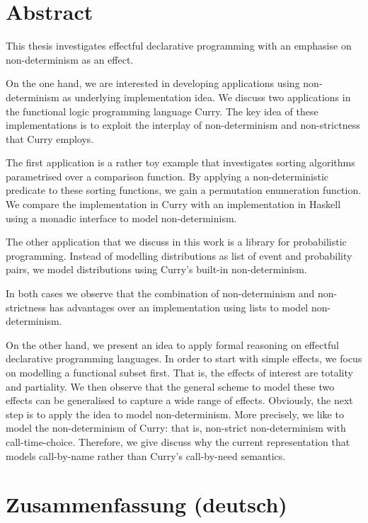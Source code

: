 %
\begingroup
\let\cleardoublepage\clearpage

\chapter*{Abstract}
\label{sec:abstract}
This thesis investigates effectful declarative programming with an
emphasise on non-determinism as an effect.

On the one hand, we are interested in developing applications using
non-determinism as underlying implementation idea.
We discuss two applications in the functional logic programming
language Curry.
The key idea of these implementations is to exploit the interplay of
non-determinism and non-strictness that Curry employs.

The first application is a rather toy example that investigates
sorting algorithms parametrised over a comparison function.
By applying a non-deterministic predicate to these sorting functions,
we gain a permutation enumeration function.
We compare the implementation in Curry with an implementation in
Haskell using a monadic interface to model non-determinism.

The other application that we discuss in this work is a library for
probabilistic programming.
Instead of modelling distributions as list of event and probability
pairs, we model distributions using Curry's built-in non-determinism.

In both cases we observe that the combination of non-determinism and
non-strictness has advantages over an implementation using lists to
model non-determinism.

On the other hand, we present an idea to apply formal reasoning on
effectful declarative programming languages.
In order to start with simple effects, we focus on modelling a
functional subset first.
That is, the effects of interest are totality and partiality.
We then observe that the general scheme to model these two effects can
be generalised to capture a wide range of effects.
Obviously, the next step is to apply the idea to model
non-determinism.
More precisely, we like to model the non-determinism of Curry: that is,
non-strict non-determinism with call-time-choice.
Therefore, we give discuss why the current representation that models
call-by-name rather than Curry's call-by-need semantics.

\chapter*{Zusammenfassung (deutsch)}
\label{sec:abstract-diff}

